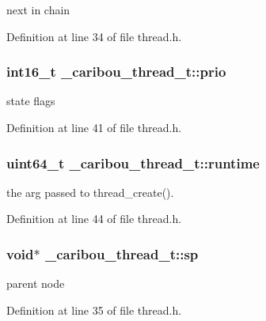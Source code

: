 next in chain 



Definition at line 34 of file thread.\-h.

\hypertarget{struct__caribou__thread__t_a91f8936a0a3a5c21c4ffcbe1045c34ee}{
\subsubsection[{prio}]{\setlength{\rightskip}{0pt plus 5cm}int16\-\_\-t \-\_\-caribou\-\_\-thread\-\_\-t\-::prio}}\label{struct__caribou__thread__t_a91f8936a0a3a5c21c4ffcbe1045c34ee}


state flags 



Definition at line 41 of file thread.\-h.

\hypertarget{struct__caribou__thread__t_a942c87c4803e79dabc7fd0b5e24afb63}{
\subsubsection[{runtime}]{\setlength{\rightskip}{0pt plus 5cm}uint64\-\_\-t \-\_\-caribou\-\_\-thread\-\_\-t\-::runtime}}\label{struct__caribou__thread__t_a942c87c4803e79dabc7fd0b5e24afb63}


the arg passed to thread\-\_\-create(). 



Definition at line 44 of file thread.\-h.

\hypertarget{struct__caribou__thread__t_aceaf2820170f1252157576769bf04672}{
\subsubsection[{sp}]{\setlength{\rightskip}{0pt plus 5cm}void$\ast$ \-\_\-caribou\-\_\-thread\-\_\-t\-::sp}}\label{struct__caribou__thread__t_aceaf2820170f1252157576769bf04672}


parent node 



Definition at line 35 of file thread.\-h.

